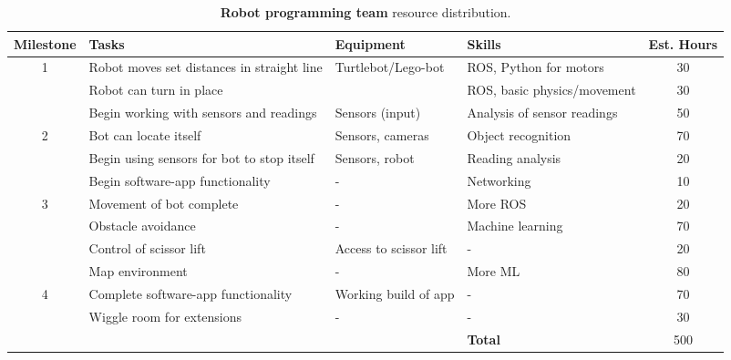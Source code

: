 \documentclass{article}
\begin{document}
\begin{table*}[]
  \begin{center}
  \begin{small}
  \begin{tabular}{|c|l|l|l|c|}
    \hline
    {\bf Milestone} & {\bf Tasks} & {\bf Equipment} & {\bf Skills} & {\bf Est. Hours} \\ \hline
    1               & Robot moves set distances in straight line & Turtlebot/Lego-bot & ROS, Python for motors & 30\\ \cline{2-5}
                    & Robot can turn in place &  & ROS, basic physics/movement & 30\\ \cline{2-5}
                    & Begin working with sensors and readings & Sensors (input) & Analysis of sensor readings & 50 \\ \hline
    2               & Bot can locate itself & Sensors, cameras & Object recognition & 70\\ \cline{2-5}
                    & Begin using sensors for bot to stop itself & Sensors, robot & Reading analysis & 20\\ \cline{2-5}
                    & Begin software-app functionality & - & Networking & 10\\ \hline
    3               & Movement of bot complete & - & More ROS & 20\\ \cline{2-5}
                    & Obstacle avoidance & - & Machine learning & 70\\ \cline{2-5}
                    & Control of scissor lift & Access to scissor lift & - & 20\\ \cline{2-5}
                    & Map environment & - & More ML & 80\\ \hline
    4               & Complete software-app functionality & Working build of app & - & 70\\ \cline{2-5}
                    & Wiggle room for extensions & - & - & 30\\ \hline
                    &  &  & {\bf Total} & 500 \\ \hline
  \end{tabular}
  \end{small}
  \caption{{\bf Robot programming team} resource distribution.}
  \label{tab:rp-rd}
  \end{center}
\end{table*}
\end{document}
